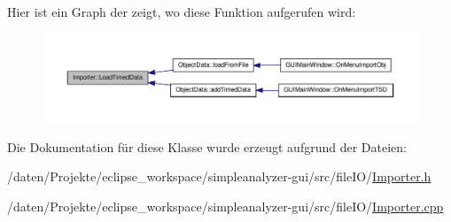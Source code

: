 Hier ist ein Graph der zeigt, wo diese Funktion aufgerufen wird\-:\nopagebreak
\begin{figure}[H]
\begin{center}
\leavevmode
\includegraphics[width=350pt]{classImporter_ad8dec9ce375155ca130453632530eb52_icgraph}
\end{center}
\end{figure}




Die Dokumentation für diese Klasse wurde erzeugt aufgrund der Dateien\-:\begin{DoxyCompactItemize}
\item 
/daten/\-Projekte/eclipse\-\_\-workspace/simpleanalyzer-\/gui/src/file\-I\-O/\hyperlink{Importer_8h}{Importer.\-h}\item 
/daten/\-Projekte/eclipse\-\_\-workspace/simpleanalyzer-\/gui/src/file\-I\-O/\hyperlink{Importer_8cpp}{Importer.\-cpp}\end{DoxyCompactItemize}
